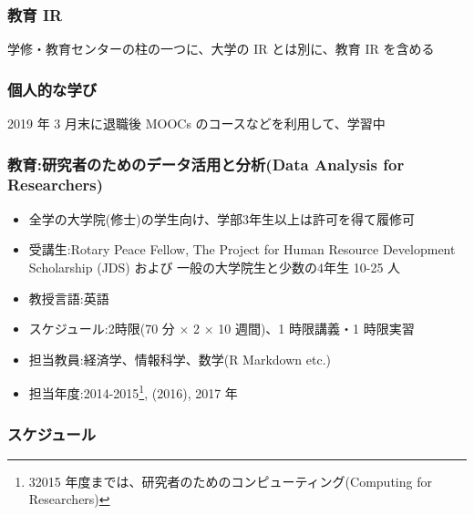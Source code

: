 \documentclass[
]{book}
\providecommand{\tightlist}{%
  \setlength{\itemsep}{0pt}\setlength{\parskip}{0pt}}
\theoremstyle{definition}
\theoremstyle{definition}
\theoremstyle{definition}
\theoremstyle{definition}
\theoremstyle{remark}
\begin{document}
\hypertarget{ux6559ux80b2-ir}{%
\subsubsection{教育 IR}\label{ux6559ux80b2-ir}}

学修・教育センターの柱の一つに、大学の IR とは別に、教育 IR を含める

\hypertarget{ux500bux4ebaux7684ux306aux5b66ux3073}{%
\subsubsection{個人的な学び}\label{ux500bux4ebaux7684ux306aux5b66ux3073}}

2019 年 3 月末に退職後 MOOCs のコースなどを利用して、学習中

\hypertarget{ux6559ux80b2ux7814ux7a76ux8005ux306eux305fux3081ux306eux30c7ux30fcux30bfux6d3bux7528ux3068ux5206ux6790data-analysis-for-researchers}{%
\subsubsection{教育:研究者のためのデータ活用と分析(Data Analysis for Researchers)}\label{ux6559ux80b2ux7814ux7a76ux8005ux306eux305fux3081ux306eux30c7ux30fcux30bfux6d3bux7528ux3068ux5206ux6790data-analysis-for-researchers}}

\begin{itemize}
\tightlist
\item
  全学の大学院(修士)の学生向け、学部3年生以上は許可を得て履修可
\item
  受講生:Rotary Peace Fellow, The Project for Human Resource Development Scholarship (JDS) および 一般の大学院生と少数の4年生 10-25 人
\item
  教授言語:英語
\item
  スケジュール:2時限(70 分 × 2 × 10 週間)、1 時限講義・1 時限実習
\item
  担当教員:経済学、情報科学、数学(R Markdown etc.)
\item
  担当年度:2014-2015\footnote{32015 年度までは、研究者のためのコンピューティング(Computing for Researchers)}, (2016), 2017 年
\end{itemize}

\hypertarget{ux30b9ux30b1ux30b8ux30e5ux30fcux30eb}{%
\subsubsection{スケジュール}\label{ux30b9ux30b1ux30b8ux30e5ux30fcux30eb}}
\end{document}
